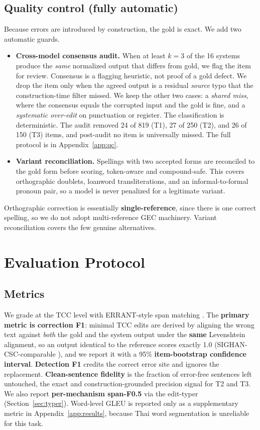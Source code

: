 \documentclass[11pt]{article}
\begin{document}
\subsection{Quality control (fully automatic)}
\label{sec:qc}
Because errors are introduced by construction, the gold is exact. We add two automatic guards.
\begin{itemize}\itemsep2pt
\item \textbf{Cross-model consensus audit.} When at least $k{=}3$ of the 16 systems produce
the \emph{same} normalized output that differs from gold, we flag the item for review.
Consensus is a flagging heuristic, not proof of a gold defect. We drop the item only when the
agreed output is a residual \emph{source} typo that the construction-time filter missed. We
keep the other two cases: a \emph{shared miss}, where the consensus equals the corrupted input
and the gold is fine, and a \emph{systematic over-edit} on punctuation or register. The
classification is deterministic. The audit removed 24 of 819 (T1), 27 of 250 (T2), and 26 of
150 (T3) items, and post-audit no item is universally missed. The full protocol is in
Appendix~\ref{app:qc}.
\item \textbf{Variant reconciliation.} Spellings with two accepted forms are reconciled to the
gold form before scoring, token-aware and compound-safe. This covers orthographic doublets,
loanword transliterations, and an informal-to-formal pronoun pair, so a model is never penalized
for a legitimate variant.
\end{itemize}
Orthographic correction is essentially \textbf{single-reference}, since there is one correct
spelling, so we do not adopt multi-reference GEC machinery. Variant reconciliation covers the
few genuine alternatives.

\section{Evaluation Protocol}

\subsection{Metrics}
We grade at the TCC level \citep{theeramunkong-etal-2000-character} with ERRANT-style span
matching \citep{bryant-etal-2017-automatic}. The \textbf{primary metric is correction F1}:
minimal TCC edits are derived by aligning the wrong text against \emph{both} the gold and the
system output under the \textbf{same} Levenshtein alignment, so an output identical to the
reference scores exactly 1.0 (SIGHAN-CSC-comparable \citep{tseng-etal-2015-introduction}), and
we report it with a 95\% \textbf{item-bootstrap confidence interval}. \textbf{Detection F1}
credits the correct error site and ignores the replacement. \textbf{Clean-sentence fidelity}
is the fraction of error-free sentences left untouched, the exact and construction-grounded
precision signal for T2 and T3. We also report \textbf{per-mechanism span-F0.5} via the
edit-typer (Section~\ref{sec:typer}). Word-level GLEU is reported only as a supplementary metric in
Appendix~\ref{app:results}, because Thai word segmentation is unreliable for this task.
\end{document}
